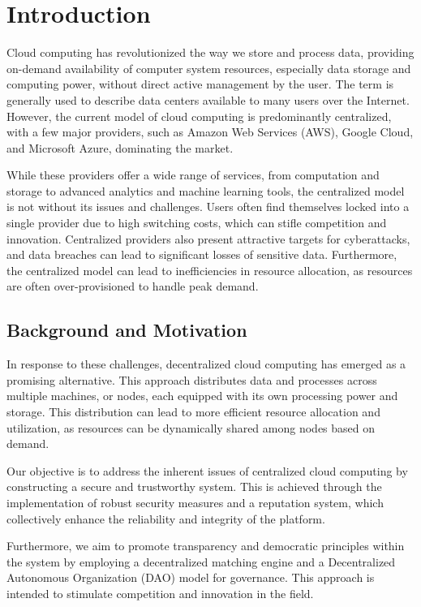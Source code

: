 \section{Introduction}
\label{sec:introduction}

Cloud computing has revolutionized the way we store and process data, providing on-demand availability of computer system resources, especially data storage and computing power, without direct active management by the user. The term is generally used to describe data centers available to many users over the Internet. However, the current model of cloud computing is predominantly centralized, with a few major providers, such as Amazon Web Services (AWS), Google Cloud, and Microsoft Azure, dominating the market.

While these providers offer a wide range of services, from computation and storage to advanced analytics and machine learning tools, the centralized model is not without its issues and challenges. Users often find themselves locked into a single provider due to high switching costs, which can stifle competition and innovation. Centralized providers also present attractive targets for cyberattacks, and data breaches can lead to significant losses of sensitive data. Furthermore, the centralized model can lead to inefficiencies in resource allocation, as resources are often over-provisioned to handle peak demand.

\subsection{Background and Motivation}
\label{sec:background}

In response to these challenges, decentralized cloud computing has emerged as a promising alternative. This approach distributes data and processes across multiple machines, or nodes, each equipped with its own processing power and storage. This distribution can lead to more efficient resource allocation and utilization, as resources can be dynamically shared among nodes based on demand.

Our objective is to address the inherent issues of centralized cloud computing by constructing a secure and trustworthy system. This is achieved through the implementation of robust security measures and a reputation system, which collectively enhance the reliability and integrity of the platform.

Furthermore, we aim to promote transparency and democratic principles within the system by employing a decentralized matching engine and a Decentralized Autonomous Organization (DAO) model for governance. This approach is intended to stimulate competition and innovation in the field.

